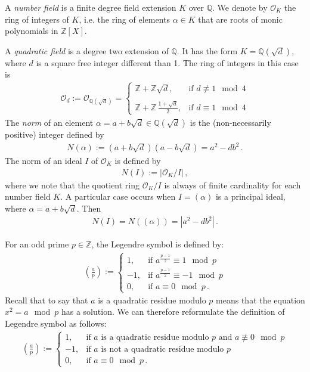\documentclass[reqno]{amsart}
\theoremstyle{plain}
\theoremstyle{definition}
\theoremstyle{remark}
\numberwithin{equation}{section}
\begin{document}
A {\em number field} is a finite degree field extension $K$ over
${{\mathbb Q}}$. We denote by ${{\mathcal O}}_K$ the ring of integers of $K$, i.e. the
ring of elements $\alpha\in K$ that are roots of monic polynomials in
${{\mathbb Z}}[X]$.

A {\em quadratic field} is a degree two extension of ${{\mathbb Q}}$. It has the
form $K={{\mathbb Q}}(\sqrt{d})$, where $d$ is a square free integer different
than 1. The ring of integers in this case is
\begin{align*}
  {{\mathcal O}}_d := {{\mathcal O}}_{{{\mathbb Q}}(\sqrt{d})} = \left\{
  \begin{array}{cc}
    {{\mathbb Z}} + {{\mathbb Z}}\sqrt{d}, & \text{if } d\not\equiv 1\mod 4\\
    \,\\
    {{\mathbb Z}} + {{\mathbb Z}}\,\displaystyle\frac{1+\sqrt{d}}{2}, & \text{if } d\equiv 1\mod 4
  \end{array}\right.
\end{align*}
The {\em norm} of an element $\alpha=a+b\sqrt d\in{{\mathbb Q}}(\sqrt d)$ is the
(non-necessarily positive) integer defined by
\begin{align*}
  N(\alpha) := (a+b\sqrt d)(a-b\sqrt d) = a^2 - db^2\,.
\end{align*}
The norm of an ideal $I$ of ${{\mathcal O}}_K$ is
defined by
\begin{align*}
  N(I) := |{{\mathcal O}}_{K}/I|\,,
\end{align*}
where we note that the quotient ring ${{\mathcal O}}_{K}/I$ is always of finite
cardinality for each number field $K$. A particular case occurs when
$I=(\alpha)$ is a principal ideal, where $\alpha=a+b\sqrt d$. Then
\begin{align*}
  N(I) = N((\alpha)) = |a^2 - db^2|\,.
\end{align*}

For an odd prime $p\in{{\mathbb Z}}$, the Legendre symbol is defined by:
\begin{align*}
  \left(\frac{a}{p}\right) :=\left\{
  \begin{array}{ll}
    1, & \text{if } a^{\frac{p-1}{2}} \equiv 1\mod p\\
    -1, & \text{if } a^{\frac{p-1}{2}} \equiv -1\mod p\\
    0, & \text{if } a \equiv 0\mod p\,.
  \end{array}\right.
\end{align*}
Recall that to say that $a$ is a quadratic residue modulo $p$ means
that the equation $x^2=a\mod p$ has a solution. We can therefore
reformulate the definition of Legendre symbol as follows:
\begin{align*}
  \left(\frac{a}{p}\right) :=\left\{
  \begin{array}{ll}
    1, & \text{if } a \text{ is a quadratic residue modulo } p \text{ and } a\not\equiv 0\mod p\\
    -1, & \text{if } a \text{ is not a quadratic residue modulo } p \\
    0, & \text{if } a\equiv 0\mod p \,.
  \end{array}\right.
\end{align*}
\end{document}
